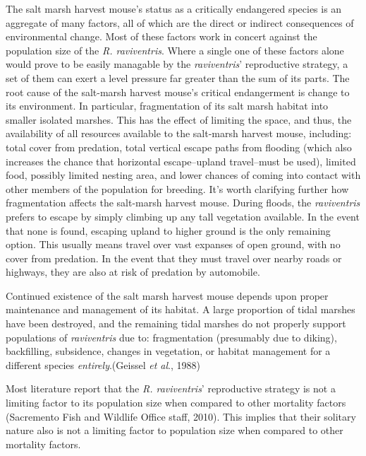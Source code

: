 \documentclass[a4paper]{article}
\begin{document}
The salt marsh harvest mouse's status as a critically endangered species is an aggregate of many factors, all of which are the direct or indirect consequences of environmental change. Most of these factors work in concert against the population size of the \textit{R. raviventris}. Where a single one of these factors alone would prove to be easily managable by the \textit{raviventris}' reproductive strategy, a set of them can exert a level pressure far greater than the sum of its parts. The root cause of the salt-marsh harvest mouse's critical endangerment is change to its environment. In particular, fragmentation of its salt marsh habitat into smaller isolated marshes. This has the effect of limiting the space, and thus, the availability of all resources available to the salt-marsh harvest mouse, including: total cover from predation, total vertical escape paths from flooding (which also increases the chance that horizontal escape--upland travel--must be used), limited food, possibly limited nesting area, and lower chances of coming into contact with other members of the population for breeding. It's worth clarifying further how fragmentation affects the salt-marsh  harvest mouse. During floods, the \textit{raviventris} prefers to escape by simply climbing up any tall vegetation available. In the event that none is found, escaping upland to higher ground is the only remaining option. This usually means travel over vast expanses of open ground, with no cover from predation. In the event that they must travel over nearby roads or highways, they are also at risk of predation by automobile.

Continued existence of the salt marsh harvest mouse depends upon proper maintenance and management of its habitat. A large proportion of tidal marshes have been destroyed, and the remaining tidal marshes do not properly support populations of \textit{raviventris} due to: fragmentation (presumably due to diking), backfilling, subsidence, changes in vegetation, or habitat management for a different species \textit{entirely}.(Geissel \textit{et al}., 1988)

Most literature report that the \textit{R. raviventris}' reproductive strategy is not a limiting factor to its population size when compared to other mortality factors (Sacremento Fish and Wildlife Office staff, 2010). This implies that their solitary nature also is not a limiting factor to population size when compared to other mortality factors.
\end{document}

